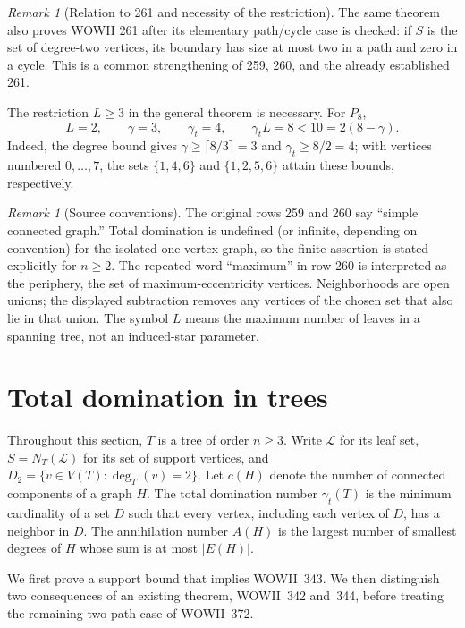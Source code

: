 \documentclass[11pt,a4paper]{article}
\theoremstyle{remark}
\newtheorem{remark}[theorem]{Remark}
\begin{document}
\begin{remark}[Relation to 261 and necessity of the restriction]
\label{r3td:restriction}
The same theorem also proves WOWII 261 after its elementary path/cycle
case is checked: if $S$ is the set of degree-two vertices, its boundary
has size at most two in a path and zero in a cycle. This is a common
strengthening of 259, 260, and the already established 261.

The restriction $L\ge3$ in the general theorem is necessary. For $P_8$,
\[
 L=2,\qquad \gamma=3,\qquad \gamma_t=4,
 \qquad \gamma_tL=8<10=2(8-\gamma).
\]
Indeed, the degree bound gives $\gamma\ge\lceil8/3\rceil=3$ and
$\gamma_t\ge8/2=4$; with vertices numbered $0,\ldots,7$, the sets
$\{1,4,6\}$ and $\{1,2,5,6\}$ attain these bounds, respectively.
\end{remark}

\begin{remark}[Source conventions]
\label{r3td:source}
The original rows 259 and 260 say ``simple connected graph.'' Total
domination is undefined (or infinite, depending on convention) for the
isolated one-vertex graph, so the finite assertion is stated explicitly
for $n\ge2$. The repeated word ``maximum'' in row 260 is interpreted as
the periphery, the set of maximum-eccentricity vertices. Neighborhoods
are open unions; the displayed subtraction removes any vertices of the
chosen set that also lie in that union. The symbol $L$ means the maximum
number of leaves in a spanning tree, not an induced-star parameter.

\end{remark}

\section{Total domination in trees}
\label{sec:treeTD}

Throughout this section, $T$ is a tree of order $n\geq 3$.  Write
$\mathcal L$ for its leaf set, $S=N_T(\mathcal L)$ for its set of support
vertices, and $D_2=\{v\in V(T):\deg_T(v)=2\}$.  Let $c(H)$ denote the
number of connected components of a graph $H$.  The total domination
number $\gamma_t(T)$ is the minimum cardinality of a set $D$ such that
every vertex, including each vertex of $D$, has a neighbor in $D$.
The annihilation number $A(H)$ is the largest number of smallest degrees
of $H$ whose sum is at most $|E(H)|$.

We first prove a support bound that implies WOWII~343.  We then distinguish
two consequences of an existing theorem, WOWII~342 and~344, before treating
the remaining two-path case of WOWII~372.
\end{document}
